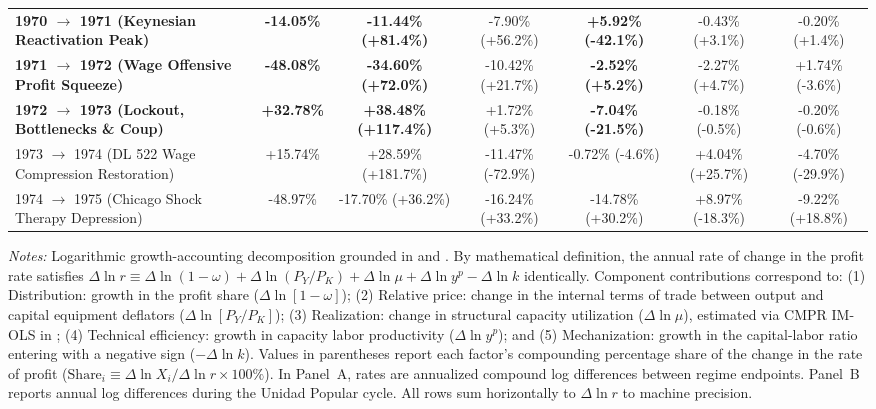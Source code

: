 \begin{table}[htbp]
{\begin{tabular}{lcccccc}
\textbf{1970 $\to$ 1971 (Keynesian Reactivation Peak)} & \textbf{-14.05\%} & \textbf{-11.44\% (+81.4\%)} & -7.90\% (+56.2\%) & \textbf{+5.92\% (-42.1\%)} & -0.43\% (+3.1\%) & -0.20\% (+1.4\%) \\
\textbf{1971 $\to$ 1972 (Wage Offensive Profit Squeeze)} & \textbf{-48.08\%} & \textbf{-34.60\% (+72.0\%)} & -10.42\% (+21.7\%) & \textbf{-2.52\% (+5.2\%)} & -2.27\% (+4.7\%) & +1.74\% (-3.6\%) \\
\textbf{1972 $\to$ 1973 (Lockout, Bottlenecks \& Coup)} & \textbf{+32.78\%} & \textbf{+38.48\% (+117.4\%)} & +1.72\% (+5.3\%) & \textbf{-7.04\% (-21.5\%)} & -0.18\% (-0.5\%) & -0.20\% (-0.6\%) \\
1973 $\to$ 1974 (DL 522 Wage Compression Restoration) & +15.74\% & +28.59\% (+181.7\%) & -11.47\% (-72.9\%) & -0.72\% (-4.6\%) & +4.04\% (+25.7\%) & -4.70\% (-29.9\%) \\
1974 $\to$ 1975 (Chicago Shock Therapy Depression) & -48.97\% & -17.70\% (+36.2\%) & -16.24\% (+33.2\%) & -14.78\% (+30.2\%) & +8.97\% (-18.3\%) & -9.22\% (+18.8\%) \\
\bottomrule
\end{tabular}%
}
\begin{minipage}{0.98\textwidth}
\vspace{0.4em}
\footnotesize
\textit{Notes:} Logarithmic growth-accounting decomposition grounded in \citet[Section 6.1, Eqs.~28--31]{Basu2017} and \citet{Weisskopf1978,Weisskopf1979}. By mathematical definition, the annual rate of change in the profit rate satisfies $\Delta \ln r \equiv \Delta \ln(1 - \omega) + \Delta \ln(P_Y / P_K) + \Delta \ln \mu + \Delta \ln y^p - \Delta \ln k$ identically. Component contributions correspond to: (1) Distribution: growth in the profit share ($\Delta \ln[1 - \omega]$); (2) Relative price: change in the internal terms of trade between output and capital equipment deflators ($\Delta \ln[P_Y / P_K]$); (3) Realization: change in structural capacity utilization ($\Delta \ln \mu$), estimated via CMPR IM-OLS in \citet{Polanco2026}; (4) Technical efficiency: growth in capacity labor productivity ($\Delta \ln y^p$); and (5) Mechanization: growth in the capital-labor ratio entering with a negative sign ($-\Delta \ln k$). Values in parentheses report each factor's compounding percentage share of the change in the rate of profit ($\text{Share}_i \equiv \Delta \ln X_i / \Delta \ln r \times 100\%$). In Panel~A, rates are annualized compound log differences between regime endpoints. Panel~B reports annual log differences during the Unidad Popular cycle. All rows sum horizontally to $\Delta \ln r$ to machine precision.
\end{minipage}
\end{table}
